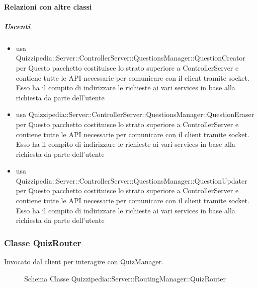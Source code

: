 \paragraph{Relazioni con altre classi}
\subparagraph{Uscenti}
\begin{itemize}
\item usa Quizzipedia::Server::ControllerServer::QuestionsManager::QuestionCreator per Questo pacchetto costituisce lo strato superiore a ControllerServer e contiene tutte le API necessarie per comunicare con il client tramite socket. Esso ha il compito di indirizzare le richieste ai vari services in base alla richiesta da parte dell'utente
\item usa Quizzipedia::Server::ControllerServer::QuestionsManager::QuestionEraser per Questo pacchetto costituisce lo strato superiore a ControllerServer e contiene tutte le API necessarie per comunicare con il client tramite socket. Esso ha il compito di indirizzare le richieste ai vari services in base alla richiesta da parte dell'utente
\item usa Quizzipedia::Server::ControllerServer::QuestionsManager::QuestionUpdater per Questo pacchetto costituisce lo strato superiore a ControllerServer e contiene tutte le API necessarie per comunicare con il client tramite socket. Esso ha il compito di indirizzare le richieste ai vari services in base alla richiesta da parte dell'utente
\end{itemize}
\subsubsection{Classe QuizRouter}
Invocato dal client per interagire con QuizManager.
\begin{figure}[H]
\centering
\noindent{}
\caption[Schema Classe QuizRouter]{Schema Classe Quizzipedia::Server::RoutingManager::QuizRouter}
\end{figure}
